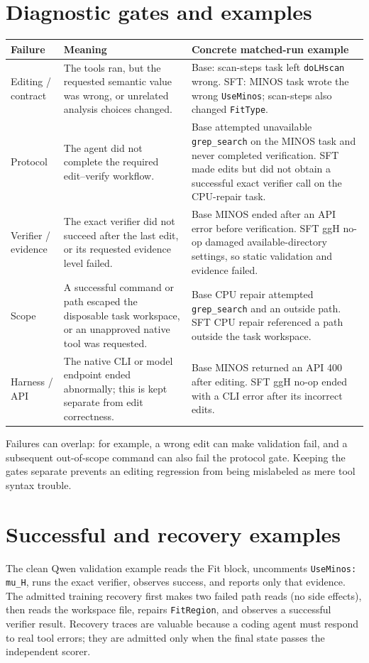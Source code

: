 \documentclass[10.5pt]{article}
\newcommand{\code}[1]{\texttt{#1}}
\begin{document}
\section{Diagnostic gates and examples}
\begin{tabularx}{\textwidth}{@{}p{}p{}X@{}}
\toprule
Failure & Meaning & Concrete matched-run example \\
\midrule
Editing / contract & The tools ran, but the requested semantic value was wrong,
or unrelated analysis choices changed. & Base: scan-steps task left
\code{doLHscan} wrong. SFT: MINOS task wrote the wrong \code{UseMinos};
scan-steps also changed \code{FitType}. \\
Protocol & The agent did not complete the required edit--verify workflow. &
Base attempted unavailable \code{grep\_search} on the MINOS task and never
completed verification. SFT made edits but did not obtain a successful exact
verifier call on the CPU-repair task. \\
Verifier / evidence & The exact verifier did not succeed after the last edit,
or its requested evidence level failed. & Base MINOS ended after an API error
before verification. SFT ggH no-op damaged available-directory settings, so
static validation and evidence failed. \\
Scope & A successful command or path escaped the disposable task workspace, or
an unapproved native tool was requested. & Base CPU repair attempted
\code{grep\_search} and an outside path. SFT CPU repair referenced a path outside
the task workspace. \\
Harness / API & The native CLI or model endpoint ended abnormally; this is kept
separate from edit correctness. & Base MINOS returned an API 400 after editing.
SFT ggH no-op ended with a CLI error after its incorrect edits. \\
\bottomrule
\end{tabularx}

Failures can overlap: for example, a wrong edit can make validation fail, and a
subsequent out-of-scope command can also fail the protocol gate.  Keeping the
gates separate prevents an editing regression from being mislabeled as mere
tool syntax trouble.

\section{Successful and recovery examples}
The clean Qwen validation example reads the Fit block, uncomments
\code{UseMinos: mu\_H}, runs the exact verifier, observes success, and reports
only that evidence.  The admitted training recovery first makes two failed
path reads (no side effects), then reads the workspace file, repairs
\code{FitRegion}, and observes a successful verifier result.  Recovery traces
are valuable because a coding agent must respond to real tool errors; they are
admitted only when the final state passes the independent scorer.
\end{document}
